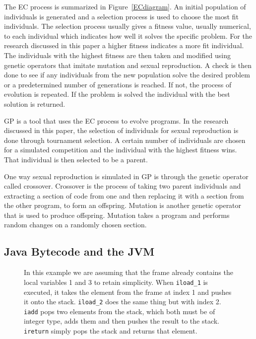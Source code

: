 \documentclass{sig-alternate}
\begin{document}
The EC process is summarized in Figure~\ref{ECdiagram}. An initial population of individuals is generated and a selection process is used to choose the most fit individuals. The selection process usually gives a fitness value, usually numerical, to each individual which indicates how well it solves the specific problem. For the research discussed in this paper a higher fitness indicates a more fit individual. The individuals with the highest fitness are then taken and modified using genetic operators that imitate mutation and sexual reproduction. A check is then done to see if any individuals from the new population solve the desired problem or a predetermined number of generations is reached. If not, the process of evolution is repeated.  If the problem is solved the individual with the best solution is returned.\par

	GP is a tool that uses the EC process to evolve programs. In the research discussed in this paper, the selection of individuals for sexual reproduction is done through tournament selection. A certain number of individuals are chosen for a simulated competition and the individual with the highest fitness wins. That individual is then selected to be a parent.\par 
		
	One way sexual reproduction is simulated in GP is through the genetic operator called crossover. Crossover is the process of taking two parent individuals and extracting a section of code from one and then replacing it with a section from the other program, to form an offspring. Mutation is another genetic operator that is used to produce offspring. Mutation takes a program and performs random changes on a randomly chosen section.


\subsection{Java Bytecode and the JVM}

\begin{figure}
\centering
{}

\caption{In this example we are assuming that the frame already contains the local variables 1 and 3 to retain simplicity. When \texttt{iload\_1} is executed, it takes the element from the frame at index 1 and pushes it onto the stack. \texttt{iload\_2} does the same thing but with index 2. \texttt{iadd} pops two elements from the stack, which both must be of integer type, adds them and then pushes the result to the stack. \texttt{ireturn} simply pops the stack and returns that element.}
\label{stack}
\end{figure}
\end{document}
